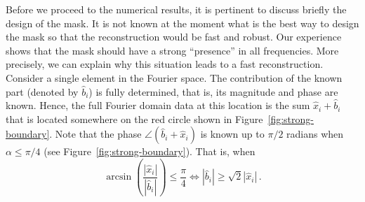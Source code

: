 Before we proceed to the
numerical results, it is pertinent to discuss briefly the design of
the mask. It is not known at the moment what is the best way to design
the mask so that the reconstruction would be fast and robust. Our
experience shows that the mask should have a strong ``presence'' in
all frequencies. More precisely, we can explain why this situation
leads to a fast reconstruction. Consider a single element in the
Fourier space. The contribution of the known part (denoted by
$\hat{b}_{i}$) is fully determined, that is, its magnitude and phase
are known. Hence, the full Fourier domain data at this location is the
sum $\hat{x}_{i}+\hat{b}_{i}$ that is located somewhere on the red circle
shown in Figure~\ref{fig:strong-boundary}. Note that the phase
$\angle(\hat{b}_{i} + \hat{x}_{i})$ is known up to $\pi/2$ radians
when $\alpha \leq \pi/4$ (see Figure~\ref{fig:strong-boundary}). That
is, when
\begin{equation}
  \label{eq:boundary-6}
  \arcsin
  \left (
    \frac{|\hat{x}_{i}|}{|\hat{b}_{i}|}
  \right ) \leq \frac{\pi}{4}
  \Longleftrightarrow |\hat{b}_{i}| \geq \sqrt{2} |\hat{x}_{i}| \,. 
\end{equation}


